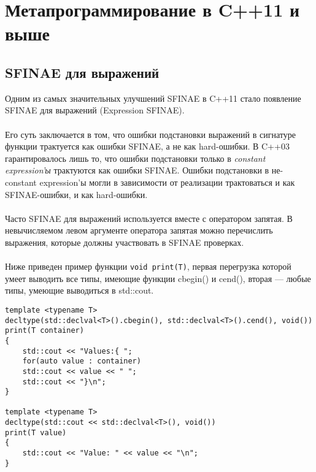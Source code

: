\section{Метапрограммирование в C++11 и выше}
\subsection{SFINAE для выражений}
Одним из самых значительных улучшений SFINAE в C++11 стало появление SFINAE для выражений (Expression SFINAE). \\\\
Его суть заключается в том, что ошибки подстановки выражений в сигнатуре функции трактуется как ошибки SFINAE, а не как hard-ошибки.
В C++03 гарантировалось лишь то, что ошибки подстановки только в \textit{constant expression'ы} трактуются как ошибки SFINAE. Ошибки подстановки в не-constant expression'ы могли в зависимости от реализации трактоваться и как SFINAE-ошибки, и как hard-ошибки. \\\\
Часто SFINAE для выражений используется вместе с оператором запятая. В невычисляемом левом аргументе оператора запятая можно перечислить выражения, которые должны участвовать в SFINAE проверках. \\\\
Ниже приведен пример функции \texttt{void print(T)}, первая перегрузка которой умеет выводить все типы, имеющие функции cbegin() и cend(), вторая --- любые типы, умеющие выводиться в std::cout.
\begin{verbatim}
template <typename T>
decltype(std::declval<T>().cbegin(), std::declval<T>().cend(), void())
print(T container)
{
	std::cout << "Values:{ ";
	for(auto value : container)
	std::cout << value << " ";
	std::cout << "}\n";
}

template <typename T>
decltype(std::cout << std::declval<T>(), void())
print(T value)
{
	std::cout << "Value: " << value << "\n";
}	
\end{verbatim}

